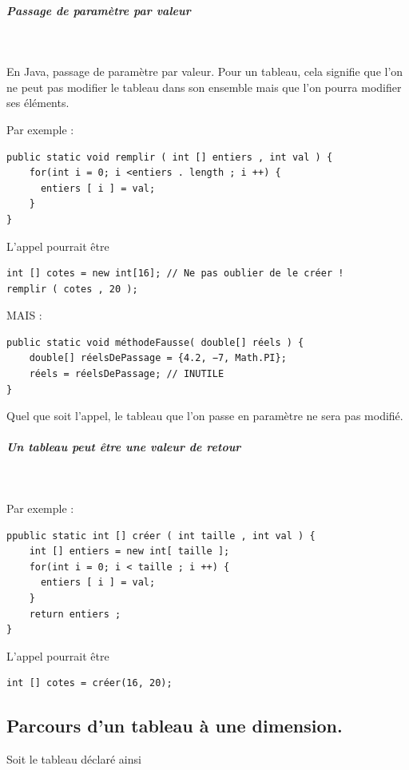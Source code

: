 \documentclass[11pt,a4paper]{article}
\begin{document}
		\subparagraph{Passage de param\`etre par valeur} 
		
					\textcolor{white}{.} \par
				
        En Java, passage de param\`etre par valeur.
        Pour un tableau, cela signifie que l'on ne peut pas
        modifier le tableau dans son ensemble mais que
        l'on pourra modifier ses \'el\'ements.
      
            \par
        Par exemple :
            \par
        \begin{verbatim}
public static void remplir ( int [] entiers , int val ) {
    for(int i = 0; i <entiers . length ; i ++) {
      entiers [ i ] = val;
    }
}\end{verbatim}L'appel pourrait \^etre
            \par
        \begin{verbatim}
int [] cotes = new int[16]; // Ne pas oublier de le créer !
remplir ( cotes , 20 );
      \end{verbatim}MAIS :
            \par
        \begin{verbatim}
public static void méthodeFausse( double[] réels ) {
    double[] réelsDePassage = {4.2, −7, Math.PI};
    réels = réelsDePassage; // INUTILE
}\end{verbatim}
        Quel que soit l'appel, le tableau que l'on passe en
        param\`etre ne sera pas modifi\'e.
      
            \par
        
			
		\subparagraph{Un tableau peut \^etre une valeur de retour} 
		
					\textcolor{white}{.} \par
				
            \par
        Par exemple :
            \par
        \begin{verbatim}
ppublic static int [] créer ( int taille , int val ) {
    int [] entiers = new int[ taille ];
    for(int i = 0; i < taille ; i ++) {
      entiers [ i ] = val;
    }
    return entiers ;
}\end{verbatim}L'appel pourrait \^etre
            \par
        \begin{verbatim}
int [] cotes = créer(16, 20);
      \end{verbatim}\subsection{Parcours d'un tableau \`a une dimension.}
		    Soit le tableau \verb@tab@ d\'eclar\'e ainsi
		  
\end{document}
